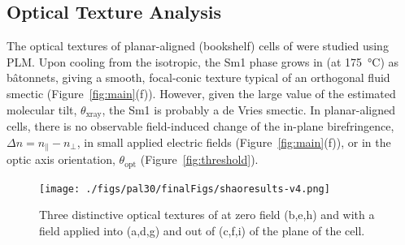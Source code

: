 \subsection{Optical Texture Analysis}
The optical textures of planar-aligned (bookshelf) cells of
 were studied using PLM.
Upon cooling from the isotropic, the Sm1 phase grows in (at \SI{175}{\degreeCelsius})
as b\^{a}tonnets, giving a smooth, focal-conic texture typical of an orthogonal fluid smectic (Figure~\ref{fig:main}(f)).
However, given the large value of the estimated
molecular tilt, $\theta_\textrm{xray}$, the Sm1 is probably a de Vries
smectic.
In planar-aligned cells, there is no observable field-induced change of the in-plane birefringence, $\Delta n= n_\parallel
-n_\perp$, in small applied electric fields  (Figure~\ref{fig:main}(f)),
or in the optic axis orientation, $\theta_\text{opt}$ (Figure~\ref{fig:threshold}).

\begin{figure}[h!]
    \centering
    \texttt{[image: ./figs/pal30/finalFigs/shaoresults-v4.png]}
    \caption{\label{fig:pal30-texture}Three distinctive optical textures of
         at zero field (b,e,h) and with a field applied into (a,d,g)
        and out of (c,f,i) of the plane of the cell. }
\end{figure}


